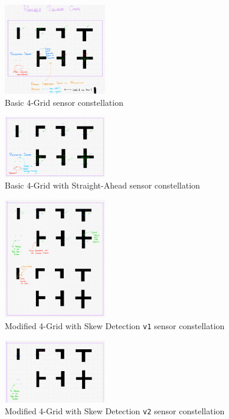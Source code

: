 \documentclass[conference]{IEEEtran}
\begin{document}
\begin{figure}[htbp]
	\centerline{\includegraphics[width=0.4\textwidth]{constellation-basic-4-grid.png}}
	\caption{Basic 4-Grid sensor constellation}
	\label{fig:constellation-basic-4-grid}
\end{figure}
\begin{figure}[htbp]
	\centerline{\includegraphics[width=0.4\textwidth]{constellation-basic-4-straight.png}}
	\caption{Basic 4-Grid with Straight-Ahead sensor constellation}
	\label{fig:constellation-basic-4-straight}
\end{figure}
\begin{figure}[htbp]
	\centerline{\includegraphics[width=0.4\textwidth]{constellation-4-skew-v1.png}}
	\caption{Modified 4-Grid with Skew Detection \texttt{v1} sensor constellation}
	\label{fig:constellation-4-skew-v1}
\end{figure}
\begin{figure}[htbp]
	\centerline{\includegraphics[width=0.4\textwidth]{constellation-4-skew-v2.png}}
	\caption{Modified 4-Grid with Skew Detection \texttt{v2} sensor constellation}
	\label{fig:constellation-4-skew-v2}
\end{figure}
\end{document}
